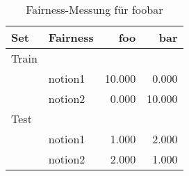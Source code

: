 \begin{table}[ht]
  \centering
  \caption{Fairness-Messung für foobar }%
  \label{tab:foobar-fairness}
  \begin{tabular}{llrr}
    \toprule
    Set & Fairness & foo & bar \\
    \midrule
      Train\\
      & notion1
      & 10.000
      & 0.000
      \\
      & notion2
      & 0.000
      & 10.000
      \\
\addlinespace
      Test\\
      & notion1
      & 1.000
      & 2.000
      \\
      & notion2
      & 2.000
      & 1.000
      \\

    \bottomrule
  \end{tabular}
\end{table}
